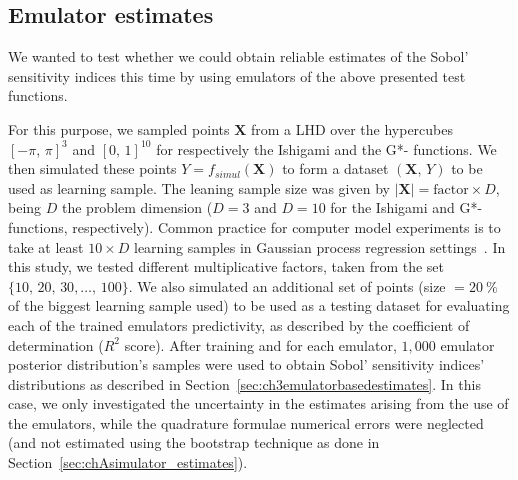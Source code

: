 %
%
%
\clearpage
\subsection{Emulator estimates}\label{sec:chAemulator_estimates}
We wanted to test whether we could obtain reliable estimates of the Sobol' sensitivity indices this time by using emulators of the above presented test functions.

\vspace{0.2cm}
For this purpose, we sampled points $\mathbf{X}$ from a LHD over the hypercubes $[-\pi,\,\pi]^3$ and $[0,\,1]^{10}$ for respectively the Ishigami and the G*- functions. We then simulated these points $Y=f_{simul}(\mathbf{X})$ to form a dataset $(\mathbf{X},\,Y)$ to be used as learning sample. The leaning sample size was given by $\vert\mathbf{X}\vert=\text{factor}\times D$, being $D$ the problem dimension ($D=3$ and $D=10$ for the Ishigami and G*- functions, respectively). Common practice for computer model experiments is to take at least $10\times D$ learning samples in Gaussian process regression settings~\cite{Rasmussen:2006}. In this study, we tested different multiplicative factors, taken from the set $\{10,\,20,\,30,\dots,\,100\}$. We also simulated an additional set of points (size $=\SI{20}{\percent}$ of the biggest learning sample used) to be used as a testing dataset for evaluating each of the trained emulators predictivity, as described by the coefficient of determination ($R^2$ score). After training and for each emulator, $1,000$ emulator posterior distribution's samples were used to obtain Sobol' sensitivity indices' distributions as described in Section~\ref{sec:ch3emulatorbasedestimates}. In this case, we only investigated the uncertainty in the estimates arising from the use of the emulators, while the quadrature formulae numerical errors were neglected (and not estimated using the bootstrap technique as done in Section~\ref{sec:chAsimulator_estimates}).

